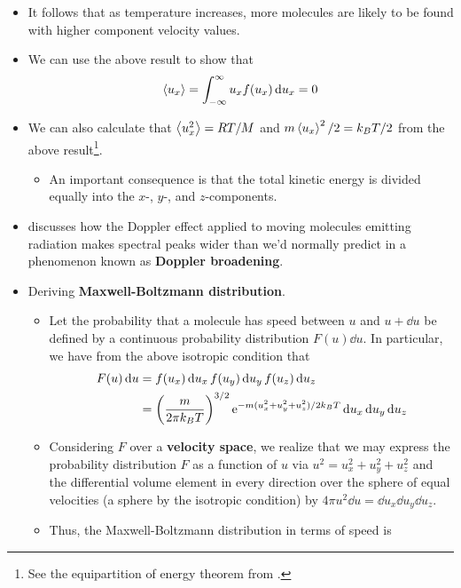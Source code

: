 \documentclass[../notes.tex]{subfiles}
\begin{document}
\begin{itemize}
\begin{itemize}
    \end{itemize}
    \item It follows that as temperature increases, more molecules are likely to be found with higher component velocity values.
    \item We can use the above result to show that
    \begin{equation*}
        \prb{u_x} = \int_{-\infty}^\infty u_xf(u_x)\dd{u_x} = 0
    \end{equation*}
    \item We can also calculate that $\prb{u_x^2}=RT/M$ and $m\prb{u_x}^2/2=k_BT/2$ from the above result\footnote{See the equipartition of energy theorem from \textcite{bib:PHYS13300Notes}.}.
    \begin{itemize}
        \item An important consequence is that the total kinetic energy is divided equally into the $x$-, $y$-, and $z$-components.
    \end{itemize}
    \item \textcite{bib:McQuarrieSimon} discusses how the Doppler effect applied to moving molecules emitting radiation makes spectral peaks wider than we'd normally predict in a phenomenon known as \textbf{Doppler broadening}.
    \item Deriving \textbf{Maxwell-Boltzmann distribution}.
    \begin{itemize}
        \item Let the probability that a molecule has speed between $u$ and $u+\dd{u}$ be defined by a continuous probability distribution $F(u)\dd{u}$. In particular, we have from the above isotropic condition that
        \begin{align*}
            F(u)\dd{u} &= f(u_x)\dd{u_x}f(u_y)\dd{u_y}f(u_z)\dd{u_z}\\
            &= \left( \frac{m}{2\pi k_BT} \right)^{3/2}\e[-m(u_x^2+u_y^2+u_z^2)/2k_BT]\dd{u_x}\dd{u_y}\dd{u_z}
        \end{align*}
        \item Considering $F$ over a \textbf{velocity space}, we realize that we may express the probability distribution $F$ as a function of $u$ via $u^2=u_x^2+u_y^2+u_z^2$ and the differential volume element in every direction over the sphere of equal velocities (a sphere by the isotropic condition) by $4\pi u^2\dd{u}=\dd{u_x}\dd{u_y}\dd{u_z}$.
        \item Thus, the Maxwell-Boltzmann distribution in terms of speed is
        \begin{equation*}

\end{equation*}
\end{itemize}
\end{itemize}
\end{document}
